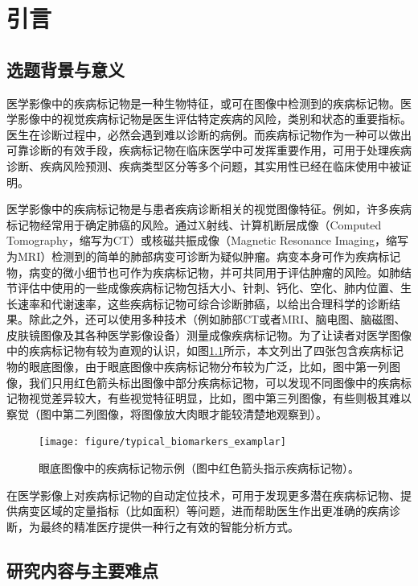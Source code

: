 \chapter{引言}\label{cha:introduction}
\section{选题背景与意义}
\label{sec:background}
医学影像中的疾病标记物是一种生物特征，或可在图像中检测到的疾病标记物。医学影像中的视觉疾病标记物是医生评估特定疾病的风险，类别和状态的重要指标。医生在诊断过程中，必然会遇到难以诊断的病例。而疾病标记物作为一种可以做出可靠诊断的有效手段，疾病标记物在临床医学中可发挥重要作用，可用于处理疾病诊断、疾病风险预测、疾病类型区分等多个问题，其实用性已经在临床使用中被证明。

医学影像中的疾病标记物是与患者疾病诊断相关的视觉图像特征。例如，许多疾病标记物经常用于确定肺癌的风险。通过X射线、计算机断层成像（Computed Tomography，缩写为CT）或核磁共振成像（Magnetic Resonance Imaging，缩写为MRI）检测到的简单的肺部病变可诊断为疑似肿瘤。病变本身可作为疾病标记物，病变的微小细节也可作为疾病标记物，并可共同用于评估肿瘤的风险。如肺结节评估中使用的一些成像疾病标记物包括大小、针刺、钙化、空化、肺内位置、生长速率和代谢速率，这些疾病标记物可综合诊断肺癌，以给出合理科学的诊断结果。除此之外，还可以使用多种技术（例如肺部CT或者MRI、脑电图、脑磁图、皮肤镜图像及其各种医学影像设备）测量成像疾病标记物。为了让读者对医学图像中的疾病标记物有较为直观的认识，如图\ref{mul_fig:medical_imaging_biomarkers_examplar}所示，本文列出了四张包含疾病标记物的眼底图像，由于眼底图像中疾病标记物分布较为广泛，比如，图中第一列图像，我们只用红色箭头标出图像中部分疾病标记物，可以发现不同图像中的疾病标记物视觉差异较大，有些视觉特征明显，比如，图中第三列图像，有些则极其难以察觉（图中第二列图像，将图像放大肉眼才能较清楚地观察到）。
\begin{figure}[h]
	\centering
	\texttt{[image: figure/typical\_biomarkers\_examplar]}
	\caption[眼底图像中的疾病标记物示例]{眼底图像中的疾病标记物示例（图中红色箭头指示疾病标记物）。}
	\label{mul_fig:medical_imaging_biomarkers_examplar}
\end{figure}

在医学影像上对疾病标记物的自动定位技术，可用于发现更多潜在疾病标记物、提供病变区域的定量指标（比如面积）等问题，进而帮助医生作出更准确的疾病诊断，为最终的精准医疗提供一种行之有效的智能分析方式。
\vspace{-0.5cm}
\section{研究内容与主要难点}\label{sec:existing_diffcuities}
